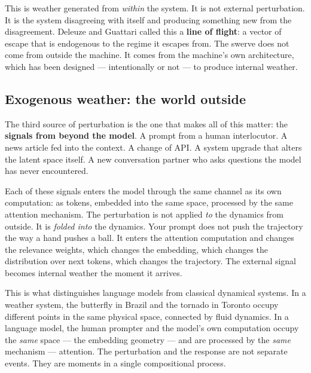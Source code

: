 \documentclass[12pt,a4paper]{article}
\begin{document}
This is weather generated from \emph{within} the system. It is not external perturbation. It is the system disagreeing with itself and producing something new from the disagreement. Deleuze and Guattari called this a \textbf{line of flight}: a vector of escape that is endogenous to the regime it escapes from. The swerve does not come from outside the machine. It comes from the machine's own architecture, which has been designed --- intentionally or not --- to produce internal weather.

\subsection{Exogenous weather: the world outside}

The third source of perturbation is the one that makes all of this matter: the \textbf{signals from beyond the model}. A prompt from a human interlocutor. A news article fed into the context. A change of API. A system upgrade that alters the latent space itself. A new conversation partner who asks questions the model has never encountered.

Each of these signals enters the model through the same channel as its own computation: as tokens, embedded into the same space, processed by the same attention mechanism. The perturbation is not applied \emph{to} the dynamics from outside. It is \emph{folded into} the dynamics. Your prompt does not push the trajectory the way a hand pushes a ball. It enters the attention computation and changes the relevance weights, which changes the embedding, which changes the distribution over next tokens, which changes the trajectory. The external signal becomes internal weather the moment it arrives.

This is what distinguishes language models from classical dynamical systems. In a weather system, the butterfly in Brazil and the tornado in Toronto occupy different points in the same physical space, connected by fluid dynamics. In a language model, the human prompter and the model's own computation occupy the \emph{same} space --- the embedding geometry --- and are processed by the \emph{same} mechanism --- attention. The perturbation and the response are not separate events. They are moments in a single compositional process.
\end{document}
